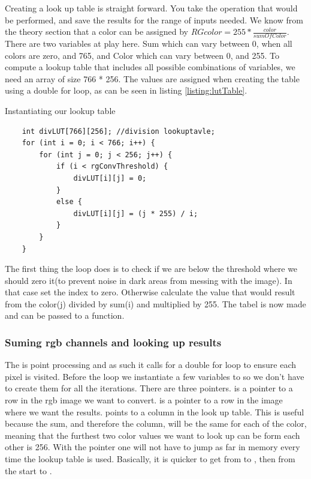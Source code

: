 Creating a look up table is straight forward. You take the operation that would be performed, and save the results for the range of inputs needed. We know from the theory section that a color can be assigned by $RGcolor = 255 * \frac{color}{sumOfColor}$. There are two variables at play here. Sum which can vary between 0, when all colors are zero, and 765, and Color which can vary between 0, and 255. To compute a lookup table  that includes all possible combinations of variables, we need an array of size 766 * 256. The values are assigned when creating the table using a double for loop, as can be seen in listing \ref{listing:lutTable}.
\begin{listing}[H]
\caption{Instantiating our lookup table}
\label{listing:lutTable}
\begin{verbatim}
	int divLUT[766][256]; //division lookuptavle;
	for (int i = 0; i < 766; i++) {
		for (int j = 0; j < 256; j++) {
			if (i < rgConvThreshold) { 
				divLUT[i][j] = 0;
			}
			else {
				divLUT[i][j] = (j * 255) / i;
			}
		}
	}
\end{verbatim}
\end{listing}
The first thing the loop does is to check if we are below the threshold where we should zero it(to prevent noise in dark areas from messing with the image). In that case  set the index to zero. Otherwise calculate the value that would result from the color(j) divided by sum(i) and multiplied by 255.
The tabel is now made and can be passed to a function. 
\subsubsection{Suming rgb channels and looking up results}
The is point processing and as such it calls for a double for loop to ensure each pixel is visited. Before the loop we instantiate a few variables to so we don't have to create them for all the iterations. There are three pointers.  is a pointer to a row in the rgb image we want to convert.  is a pointer to a row in the image where we want the results.  points to a column in the look up table. This is useful because the sum, and therefore the column, will be the same for each of the color, meaning that the furthest two color values we want to look up can be form each other is 256. With the pointer one will not have to jump as far in memory every time the lookup table is used. Basically, it is quicker to get from  to , then from the start to . 

